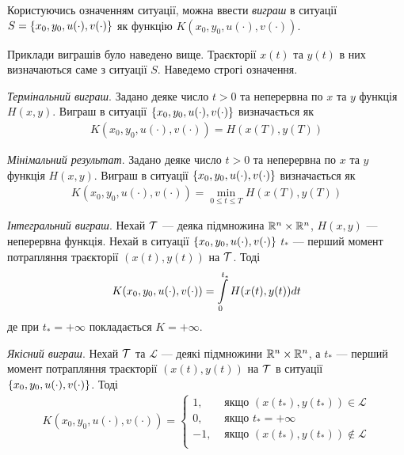 \begin{definition}
    Користуючись означенням ситуації, можна ввести \emph{виграш} в ситуації $S = \left\{x_0, y_0, u(\cdot), v(\cdot) \right\}$
    як функцію $K(x_0, y_0, u(\cdot), v(\cdot))$.
\end{definition}
Приклади виграшів було наведено вище. Траєкторії $x(t)$ та $y(t)$ в них визначаються саме з ситуації $S$. Наведемо строгі означення.
\begin{definition}
        \emph{Термінальний виграш}. Задано деяке число $t>0$ та неперервна по $x$ та $y$ функція $H(x, y)$. Виграш в ситуації $\left\{x_0, y_0, u(\cdot), v(\cdot) \right\}$
        визначається як
        \begin{gather*}
            K(x_0, y_0, u(\cdot), v(\cdot)) = H(x(T), y(T))
        \end{gather*}
        
        \emph{Мінімальний результат}. Задано деяке число $t>0$ та неперервна по $x$ та $y$ функція $H(x, y)$. Виграш в ситуації $\left\{x_0, y_0, u(\cdot), v(\cdot) \right\}$
        визначається як
        \begin{gather*}
            K(x_0, y_0, u(\cdot), v(\cdot)) = \underset{0 \leq t \leq T}{\min} H(x(T), y(T))
        \end{gather*}
        
        \emph{Інтегральний виграш}. Нехай $\mathcal{T}$ --- деяка підмножина $\mathbb{R}^n \times \mathbb{R}^n$, $H(x, y)$ --- неперервна функція. Нехай в ситуації $\left\{x_0, y_0, u(\cdot), v(\cdot) \right\}$
        $t_*$ --- перший момент потрапляння траєкторії $(x(t), y(t))$ на $\mathcal{T}$.
        Тоді
        \begin{gather*}
            K(x_0, y_0, u(\cdot), v(\cdot)) = \int\limits_0^{t_*} H(x(t), y(t)) dt
        \end{gather*}
        де при $t_* = +\infty$ покладається $K = +\infty$.

        \emph{Якісний виграш}. Нехай $\mathcal{T}$ та $\mathcal{L}$ --- деякі підмножини $\mathbb{R}^n \times \mathbb{R}^n$, а $t_*$ --- перший момент потрапляння траєкторії $(x(t), y(t))$ на $\mathcal{T}$
        в ситуації $\left\{x_0, y_0, u(\cdot), v(\cdot) \right\}$. Тоді
        \begin{gather*}
            K(x_0, y_0, u(\cdot), v(\cdot)) = \begin{cases}
                1, & \text{ якщо } (x(t_*), y(t_*)) \in \mathcal{L} \\
                0, & \text{ якщо } t_* = +\infty \\
                -1, & \text{ якщо } (x(t_*), y(t_*)) \notin \mathcal{L} \\
            \end{cases}
        \end{gather*}
\end{definition}

